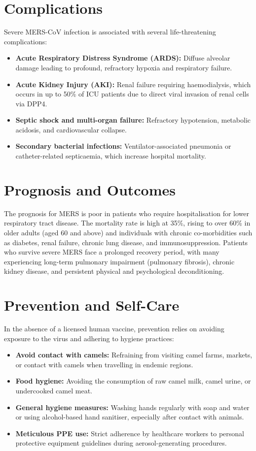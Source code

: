 \section*{Complications}
Severe MERS-CoV infection is associated with several life-threatening complications:
\begin{itemize}
    \item \textbf{Acute Respiratory Distress Syndrome (ARDS):} Diffuse alveolar damage leading to profound, refractory hypoxia and respiratory failure.
    \item \textbf{Acute Kidney Injury (AKI):} Renal failure requiring haemodialysis, which occurs in up to 50\% of ICU patients due to direct viral invasion of renal cells via DPP4.
    \item \textbf{Septic shock and multi-organ failure:} Refractory hypotension, metabolic acidosis, and cardiovascular collapse.
    \item \textbf{Secondary bacterial infections:} Ventilator-associated pneumonia or catheter-related septicaemia, which increase hospital mortality.
\end{itemize}

\section*{Prognosis and Outcomes}
The prognosis for MERS is poor in patients who require hospitalisation for lower respiratory tract disease. The mortality rate is high at 35\%, rising to over 60\% in older adults (aged 60 and above) and individuals with chronic co-morbidities such as diabetes, renal failure, chronic lung disease, and immunosuppression. Patients who survive severe MERS face a prolonged recovery period, with many experiencing long-term pulmonary impairment (pulmonary fibrosis), chronic kidney disease, and persistent physical and psychological deconditioning.

\section*{Prevention and Self-Care}
In the absence of a licensed human vaccine, prevention relies on avoiding exposure to the virus and adhering to hygiene practices:
\begin{itemize}
    \item \textbf{Avoid contact with camels:} Refraining from visiting camel farms, markets, or contact with camels when travelling in endemic regions.
    \item \textbf{Food hygiene:} Avoiding the consumption of raw camel milk, camel urine, or undercooked camel meat.
    \item \textbf{General hygiene measures:} Washing hands regularly with soap and water or using alcohol-based hand sanitiser, especially after contact with animals.
    \item \textbf{Meticulous PPE use:} Strict adherence by healthcare workers to personal protective equipment guidelines during aerosol-generating procedures.
\end{itemize}

